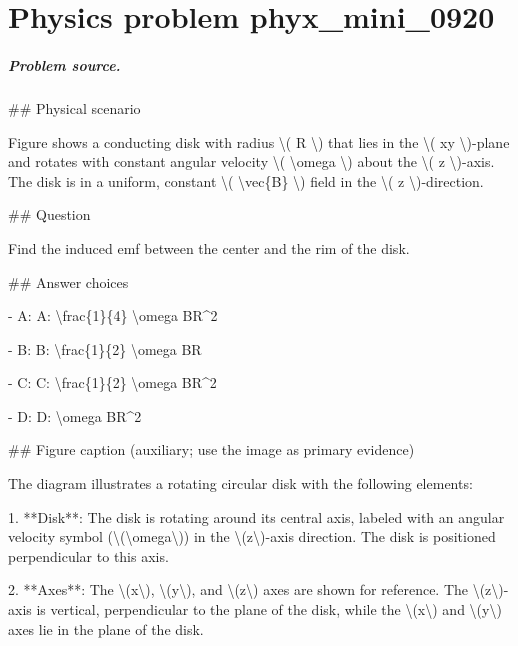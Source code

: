 
\chapter{Physics problem phyx\_mini\_0920}
\label{ch:PhyXMiniProblems_problem_phyx_mini_0920}

\paragraph{Problem source.}
\#\# Physical scenario

Figure shows a conducting disk with radius \textbackslash{}( R \textbackslash{}) that lies in the \textbackslash{}( xy \textbackslash{})-plane and rotates with constant angular velocity \textbackslash{}( \textbackslash{}omega \textbackslash{}) about the \textbackslash{}( z \textbackslash{})-axis. The disk is in a uniform, constant \textbackslash{}( \textbackslash{}vec\{B\} \textbackslash{}) field in the \textbackslash{}( z \textbackslash{})-direction.

\#\# Question

Find the induced emf between the center and the rim of the disk.

\#\# Answer choices

- A: A: \textbackslash{}frac\{1\}\{4\} \textbackslash{}omega BR\textasciicircum{}2

- B: B: \textbackslash{}frac\{1\}\{2\} \textbackslash{}omega BR

- C: C: \textbackslash{}frac\{1\}\{2\} \textbackslash{}omega BR\textasciicircum{}2

- D: D: \textbackslash{}omega BR\textasciicircum{}2

\#\# Figure caption (auxiliary; use the image as primary evidence)

The diagram illustrates a rotating circular disk with the following elements:

1. **Disk**: The disk is rotating around its central axis, labeled with an angular velocity symbol (\textbackslash{}(\textbackslash{}omega\textbackslash{})) in the \textbackslash{}(z\textbackslash{})-axis direction. The disk is positioned perpendicular to this axis.

2. **Axes**: The \textbackslash{}(x\textbackslash{}), \textbackslash{}(y\textbackslash{}), and \textbackslash{}(z\textbackslash{}) axes are shown for reference. The \textbackslash{}(z\textbackslash{})-axis is vertical, perpendicular to the plane of the disk, while the \textbackslash{}(x\textbackslash{}) and \textbackslash{}(y\textbackslash{}) axes lie in the plane of the disk.

